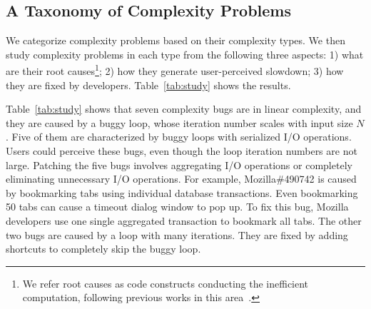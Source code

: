 \subsection{A Taxonomy of Complexity Problems}
\label{sec:tax}



We categorize complexity problems based on their complexity types.
We then study complexity problems in each type from the following three aspects:
1) what are their root causes\footnote{We refer root causes as code constructs 
conducting the inefficient computation, 
following previous works in this area~\cite{SongOOPSLA2014,ldoctor}.};
2) how they generate user-perceived slowdown;
3) how they are fixed by developers. 
Table~\ref{tab:study} shows the results. 

Table~\ref{tab:study} shows that seven complexity bugs are in linear complexity,
and they are caused by a buggy loop, 
whose iteration number scales with input size $N$.
Five of them are characterized by buggy loops with serialized I/O operations.
Users could perceive these bugs, 
even though the loop iteration numbers are not large.
Patching the five bugs involves aggregating I/O operations 
or completely eliminating unnecessary I/O operations. 
For example, Mozilla\#490742 is caused by bookmarking 
tabs using individual database transactions. 
Even bookmarking 50 tabs can cause a timeout dialog 
window to pop up. 
To fix this bug, Mozilla developers use one single aggregated transaction 
to bookmark all tabs.
The other two bugs are caused by a loop with many iterations. 
They are fixed by adding shortcuts to completely skip the buggy loop. 






